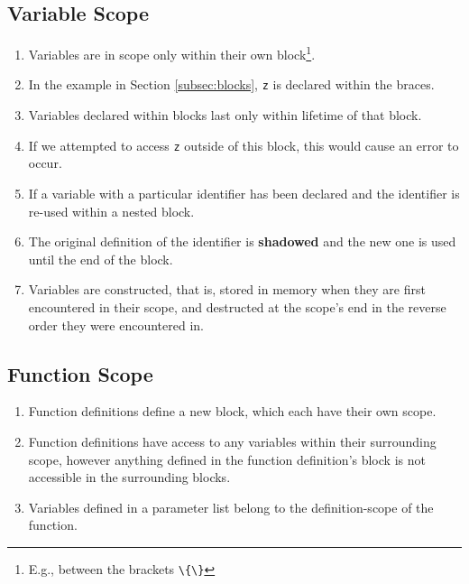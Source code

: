 \subsection {Variable Scope}
\begin{enumerate}
	\item Variables are in scope only within their own block\footnote{E.g., between the brackets \lstinline|\{\}|}.
	\item In the example in Section \ref{subsec:blocks}, \lstinline|z| is declared within the braces.
	\item Variables declared within blocks last only within lifetime of that block.
	\item If we attempted to access \lstinline|z| outside of this block, this would cause an error to occur.
	\item If a variable with a particular identifier has been declared and the identifier is re-used within a nested block.
	\item The original definition of the identifier is \textbf{shadowed} and the new one is used until the end of the block.
	\item Variables are constructed, that is, stored in memory when they are first encountered in their scope, and destructed at the scope's end in the reverse order they were encountered in.
\end{enumerate}

\subsection{Function Scope}
\begin{enumerate}
	\item Function definitions define a new block, which each have their own scope.
	\item Function definitions have access to any variables within their surrounding scope, however anything defined in the function definition's block is not accessible in the surrounding blocks.
	\item Variables defined in a parameter list belong to the definition-scope of the function.
\end{enumerate}

